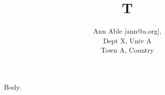 \documentclass{article}
\begin{document}
\title{T}
\author{Ann Able |ann@a.org|,\\
{\small Dept X, Univ A}\\{\small Town A, Country}}
\maketitle
Body.
\end{document}
